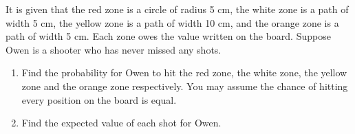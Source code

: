\documentclass[11pt]{article}
\begin{document}
\begin{enumerate}
\begin{figure}[H]
        \end{figure} It is given that the red zone is a circle of radius 5 cm, the white zone is a path of width 5 cm, the yellow zone is a path of width 10 cm, and the orange zone is a path of width 5 cm. Each zone owes the value written on the board. Suppose Owen is a shooter who has never missed any shots.\begin{enumerate}
            \item Find the probability for Owen to hit the red zone, the white zone, the yellow zone and the orange zone respectively. You may assume the chance of hitting every position on the board is equal.
            \item Find the expected value of each shot for Owen. 
        \end{enumerate}
    \end{enumerate}
\end{document}
